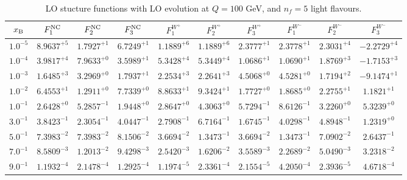 \begin{table}[h]
\begin{adjustbox}{width=\textwidth}
\begin{tabular}{|c||c|c|c|c|c|c|c|c|c|}
\hline
$x_{\rm B}$ & $F_1^{\rm NC}$ & $F_2^{\rm NC}$ & $F_3^{\rm NC}$ & $F_1^{W^+}$ & $F_2^{W^+}$ & $F_3^{W^+}$ & $F_1^{W^-}$ & $F_2^{W^-}$ & $F_3^{W^-}$ \\
\hline
$ 1.0^{-5}$ & $ 8.9637^{+5}$ & $ 1.7927^{+1}$ & $ 6.7249^{+1}$ & $ 1.1889^{+6}$ & $ 1.1889^{+6}$ & $ 2.3777^{+1}$ & $ 2.3778^{+1}$ & $ 2.3031^{+4}$ & $-2.2729^{+4}$ \\
$ 1.0^{-4}$ & $ 3.9817^{+4}$ & $ 7.9633^{+0}$ & $ 3.5989^{+1}$ & $ 5.3428^{+4}$ & $ 5.3449^{+4}$ & $ 1.0686^{+1}$ & $ 1.0690^{+1}$ & $ 1.8769^{+3}$ & $-1.7153^{+3}$ \\
$ 1.0^{-3}$ & $ 1.6485^{+3}$ & $ 3.2969^{+0}$ & $ 1.7937^{+1}$ & $ 2.2534^{+3}$ & $ 2.2641^{+3}$ & $ 4.5068^{+0}$ & $ 4.5281^{+0}$ & $ 1.7194^{+2}$ & $-9.1474^{+1}$ \\
$ 1.0^{-2}$ & $ 6.4553^{+1}$ & $ 1.2911^{+0}$ & $ 7.7339^{+0}$ & $ 8.8633^{+1}$ & $ 9.3424^{+1}$ & $ 1.7727^{+0}$ & $ 1.8685^{+0}$ & $ 2.2755^{+1}$ & $ 1.1821^{+1}$ \\
$ 1.0^{-1}$ & $ 2.6428^{+0}$ & $ 5.2857^{-1}$ & $ 1.9448^{+0}$ & $ 2.8647^{+0}$ & $ 4.3063^{+0}$ & $ 5.7294^{-1}$ & $ 8.6126^{-1}$ & $ 3.2260^{+0}$ & $ 5.3239^{+0}$ \\
$ 3.0^{-1}$ & $ 3.8423^{-1}$ & $ 2.3054^{-1}$ & $ 4.0447^{-1}$ & $ 2.7908^{-1}$ & $ 6.7164^{-1}$ & $ 1.6745^{-1}$ & $ 4.0298^{-1}$ & $ 4.8948^{-1}$ & $ 1.2319^{+0}$ \\
$ 5.0^{-1}$ & $ 7.3983^{-2}$ & $ 7.3983^{-2}$ & $ 8.1506^{-2}$ & $ 3.6694^{-2}$ & $ 1.3473^{-1}$ & $ 3.6694^{-2}$ & $ 1.3473^{-1}$ & $ 7.0902^{-2}$ & $ 2.6437^{-1}$ \\
$ 7.0^{-1}$ & $ 8.5809^{-3}$ & $ 1.2013^{-2}$ & $ 9.4298^{-3}$ & $ 2.5420^{-3}$ & $ 1.6206^{-2}$ & $ 3.5589^{-3}$ & $ 2.2689^{-2}$ & $ 5.0490^{-3}$ & $ 3.2318^{-2}$ \\
$ 9.0^{-1}$ & $ 1.1932^{-4}$ & $ 2.1478^{-4}$ & $ 1.2925^{-4}$ & $ 1.1974^{-5}$ & $ 2.3361^{-4}$ & $ 2.1554^{-5}$ & $ 4.2050^{-4}$ & $ 2.3936^{-5}$ & $ 4.6718^{-4}$ \\
\hline
\end{tabular}
\end{adjustbox}\caption{LO stucture functions with LO evolution at $Q = 100$ GeV, and $n_f=5$ light flavours.}
\label{tab:N0LO-Q100}
\end{table}


